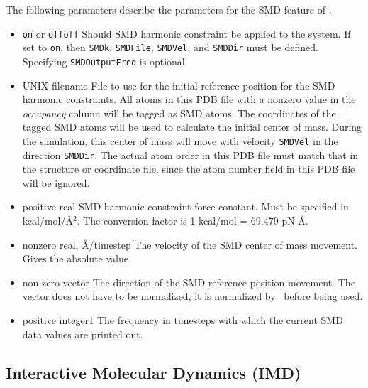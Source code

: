 The following parameters describe the parameters for the 
SMD feature of \NAMD.
\begin{itemize}
\item 
{}
{{\tt on} or {\tt off}}{{\tt off}}
{Should SMD harmonic constraint be applied to the system. If set 
to {\tt on}, then  {\tt SMDk}, {\tt SMDFile}, {\tt SMDVel}, and
{\tt SMDDir} must be defined.  Specifying {\tt SMDOutputFreq} 
is optional.}

\item
{}
{UNIX filename} {File to use for the initial reference position for the SMD
harmonic constraints.  All atoms in this PDB file with a nonzero value in the
{\em occupancy} column will be tagged as SMD atoms.  The coordinates of the
tagged SMD atoms will be used to calculate the initial center of mass.
During the simulation, this center of mass will move with velocity
{\tt SMDVel} in the direction {\tt SMDDir}. The actual atom order in this PDB
file must match that in the structure or coordinate file, since the atom
number field in this PDB file will be ignored.}

\item
{}
{positive real}
{SMD harmonic constraint force constant. Must be specified in
kcal/mol/\AA$^2$. The conversion factor is 1 kcal/mol = 69.479 pN \AA.} 

\item
{}
{nonzero real, \AA/timestep}
{The velocity of the SMD center of mass movement. Gives the absolute
value.}

\item
{}
{non-zero vector}
{The direction of the SMD reference position movement. The vector does
not have to be normalized, it is normalized by \NAMD\ before being used.}

\item
{}
{positive integer}{1} {The frequency in timesteps with which the
current SMD data values are printed out.}
\end{itemize}


\subsection{Interactive Molecular Dynamics (IMD)}

